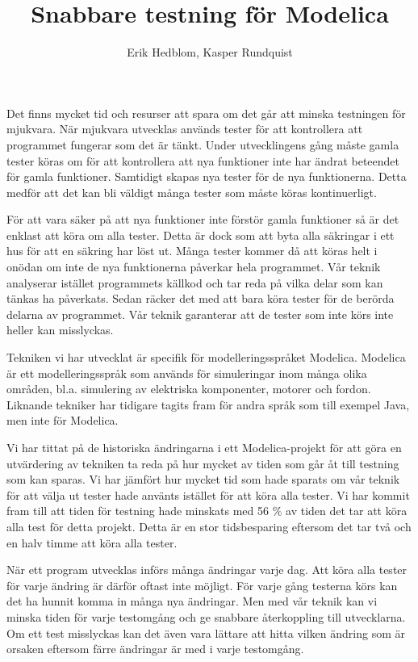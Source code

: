 \documentclass{popsci}
\author{Erik Hedblom, Kasper Rundquist}
\title{Snabbare testning för Modelica}
\begin{document}


{\noindent Det finns mycket tid och resurser att spara om det går att minska testningen för mjukvara. När mjukvara utvecklas används tester för att kontrollera att programmet fungerar som det är tänkt. Under utvecklingens gång måste gamla tester köras om för att kontrollera att nya funktioner inte har ändrat beteendet för gamla funktioner. Samtidigt skapas nya tester för de nya funktionerna. Detta medför att det kan bli väldigt många tester som måste köras kontinuerligt.

För att vara säker på att nya funktioner inte förstör gamla funktioner så är det enklast att köra om alla tester. Detta är dock som att byta alla säkringar i ett hus för att en säkring har löst ut. Många tester kommer då att köras helt i onödan om inte de nya funktionerna påverkar hela programmet. Vår teknik analyserar istället programmets källkod och tar reda på vilka delar som kan tänkas ha påverkats. Sedan räcker det med att bara köra tester för de berörda delarna av programmet. Vår teknik garanterar att de tester som inte körs inte heller kan misslyckas.

Tekniken vi har utvecklat är specifik för modelleringsspråket Modelica. Modelica är ett modelleringsspråk som används för simuleringar inom många olika områden, bl.a. simulering av elektriska komponenter, motorer och fordon. Liknande tekniker har tidigare tagits fram för andra språk som till exempel Java, men inte för Modelica. 

Vi har tittat på de historiska ändringarna i ett Modelica-projekt för att göra en utvärdering av tekniken ta reda på hur mycket av tiden som går åt till testning som kan sparas. Vi har jämfört hur mycket tid som hade sparats om vår teknik för att välja ut tester hade använts istället för att köra alla tester. Vi har kommit fram till att tiden för testning hade minskats med 56 \% av tiden det tar att köra alla test för detta projekt. Detta är en stor tidsbesparing eftersom det tar två och en halv timme att köra alla tester.

När ett program utvecklas införs många ändringar varje dag. Att köra alla tester för varje ändring är därför oftast inte möjligt. För varje gång testerna körs kan det ha hunnit komma in många nya ändringar. Men med vår teknik kan vi minska tiden för varje testomgång och ge snabbare återkoppling till utvecklarna. Om ett test misslyckas kan det även vara lättare att hitta vilken ändring som är orsaken eftersom färre ändringar är med i varje testomgång. 
}
\end{document}

